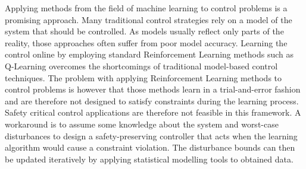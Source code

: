 \documentclass[../main.tex]{subfiles}
\begin{document}
Applying methods from the field of machine learning to control problems is a promising approach. Many traditional control strategies rely on a model of the system that should be controlled. As models usually reflect only parts of the reality, those approaches often suffer from poor model accuracy. Learning the control online by employing standard Reinforcement Learning methods such as Q-Learning overcomes the shortcomings of traditional model-based control techniques. The problem with applying Reinforcement Learning methods to control problems is however that those methods learn in a trial-and-error fashion and are therefore not designed to satisfy constraints during the learning process. Safety critical control applications are therefore not feasible in this framework. A workaround is to assume some knowledge about the system and worst-case disturbances to design a safety-preserving controller that acts when the learning algorithm would cause a constraint violation. The disturbance bounds can then be updated iteratively by applying statistical modelling tools to obtained data. 
\end{document}
